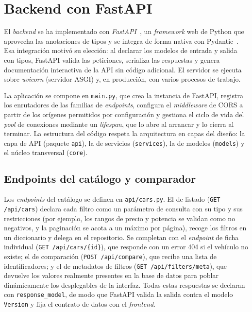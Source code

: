 \section{Backend con FastAPI}
\label{sec:impl-backend}

El \emph{backend} se ha implementado con \emph{FastAPI}~\cite{ramirez2024fastapi}, un \emph{framework} web
de Python que aprovecha las anotaciones de tipos y se integra de forma nativa con
Pydantic~\cite{pydantic2024}. Esa integración motivó su elección: al declarar los modelos de entrada y
salida con tipos, FastAPI valida las peticiones, serializa las respuestas y genera
documentación interactiva de la API sin código adicional. El servidor se ejecuta
sobre \emph{uvicorn} (servidor ASGI) y, en producción, con varios procesos de
trabajo.

La aplicación se compone en \texttt{main.py}, que crea la instancia de FastAPI,
registra los enrutadores de las familias de \emph{endpoints}, configura el
\emph{middleware} de CORS a partir de los orígenes permitidos por configuración y
gestiona el ciclo de vida del \emph{pool} de conexiones mediante un
\emph{lifespan}, que lo abre al arrancar y lo cierra al terminar. La estructura del
código respeta la arquitectura en capas del diseño: la capa de API (paquete
\texttt{api}), la de servicios (\texttt{services}), la de modelos
(\texttt{models}) y el núcleo transversal (\texttt{core}).

\subsection{Endpoints del catálogo y comparador}
\label{sec:impl-backend-catalogo}

Los \emph{endpoints} del catálogo se definen en \texttt{api/cars.py}. El de
listado (\texttt{GET /api/cars}) declara cada filtro como un parámetro de
consulta con su tipo y sus restricciones (por ejemplo, los rangos de precio y
potencia se validan como no negativos, y la paginación se acota a un máximo por
página), recoge los filtros en un diccionario y delega en el repositorio. Se
completan con el \emph{endpoint} de ficha individual (\texttt{GET
/api/cars/\{id\}}), que responde con un error 404 si el vehículo no existe; el de
comparación (\texttt{POST /api/compare}), que recibe una lista de identificadores;
y el de metadatos de filtros (\texttt{GET /api/filters/meta}), que devuelve los
valores realmente presentes en la base de datos para poblar dinámicamente los
desplegables de la interfaz. Todas estas respuestas se declaran con
\texttt{response\_model}, de modo que FastAPI valida la salida contra el modelo
\texttt{Version} y fija el contrato de datos con el \emph{frontend}.

